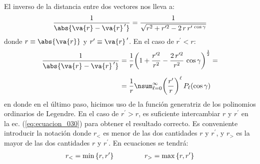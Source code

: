 El inverso de la distancia entre dos vectores nos lleva a:
\begin{align}
\dfrac{1}{\abs{\va{r} - \va{r}^{\, \prime}}} = \dfrac{1}{\sqrt{r^{2} + r^{\prime 2} - 2 \, r \, r^{\prime \, \cos \gamma}}}
\label{eq:ecuacion_029}
\end{align}
donde $r \equiv \abs{\va{r}}$ y $r^{\prime} \equiv \va{r}^{\, \prime}$. En el caso de $r^{\prime} < r$:
\begin{align}
\begin{aligned}
\dfrac{1}{\abs{\va{r} - \va{r}^{\, \prime}}} &= \dfrac{1}{r} \bigg( 1 + \dfrac{r^{\prime 2}}{r^{2}} - \dfrac{2 \, r^{\prime 2}}{r^{2}} \, \cos \gamma \bigg)^{\frac{1}{2}} = \\[0.5em]
&= \dfrac{1}{r} \nsum_{\ell=0}^{\infty} \bigg( \dfrac{r^{\prime}}{r} \bigg)^{\ell} \, P_{\ell} (\cos \gamma)
\end{aligned}
\label{eq:ecuacion_030}
\end{align}
en donde en el último paso, hicimos uso de la función generatriz de los polinomios ordinarios de Legendre. En el caso de $r^\prime > r$, es suficiente intercambiar $r$ y $r^{\prime}$ en la ec. (\ref{eq:ecuacion_030}) para obtener el resultado correcto. Es conveniente introducir la notación donde $r_{<}$ es menor de las dos cantidades $r$ y $r^{\prime}$, y $r_{>}$ es la mayor de las dos cantidades $r$ y $r^{\prime}$. En ecuaciones se tendrá:
\begin{align*}
r_{<} = \min \left\{ r, r^{\prime} \right\} \hspace{1.5cm} r_{>} = \max \left\{ r, r^{\prime} \right\}
\end{align*}

